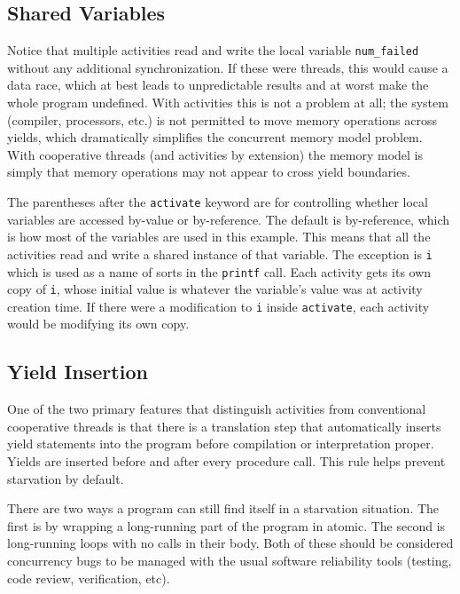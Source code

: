 \documentclass[preprint, 10pt, numbers]{sigplanconf}
\begin{document}

\subsection{Shared Variables}

Notice that multiple activities read and write the local variable \texttt{num\_failed} without any additional synchronization.
If these were threads, this would cause a data race, which at best leads to unpredictable results and at worst make the whole program undefined.
With activities this is not a problem at all; the system (compiler, processors, etc.) is not permitted to move memory operations across yields, which dramatically simplifies the concurrent memory model problem.
With cooperative threads (and activities by extension) the memory model is simply that memory operations may not appear to cross yield boundaries.

The parentheses after the \texttt{activate} keyword are for controlling whether local variables are accessed by-value or by-reference.
The default is by-reference, which is how most of the variables are used in this example.
This means that all the activities read and write a shared instance of that variable.
The exception is \texttt{i} which is used as a name of sorts in the \texttt{printf} call.
Each activity gets its own copy of \texttt{i}, whose initial value is whatever the variable's value was at activity creation time.
If there were a modification to \texttt{i} inside \texttt{activate}, each activity would be modifying its own copy.

\subsection{Yield Insertion}

One of the two primary features that distinguish activities from conventional cooperative threads is that there is a translation step that automatically inserts yield statements into the program before compilation or interpretation proper.
Yields are inserted before and after every procedure call.
This rule helps prevent starvation by default.

There are two ways a program can still find itself in a starvation situation.
The first is by wrapping a long-running part of the program in atomic.
The second is long-running loops with no calls in their body.
Both of these should be considered concurrency bugs to be managed with the usual software reliability tools (testing, code review, verification, etc).
\end{document}
